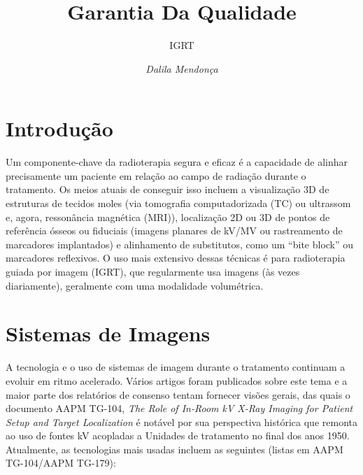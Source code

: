 \documentclass[11pt,a4paper]{article}
\title{\LobsterTwo\Huge{Garantia Da Qualidade}}
\author{\LobsterTwo\Large{IGRT}\nocite{*}}
\date{\LobsterTwo\textit{Dalila Mendonça}}
\begin{document}
	\maketitle

\section{Introdução}

    Um componente-chave da radioterapia segura e eficaz é a capacidade de alinhar precisamente um paciente em relação ao campo de radiação durante o tratamento. Os meios atuais de conseguir isso incluem a visualização 3D de estruturas de tecidos moles (via tomografia computadorizada (TC) ou ultrassom e, agora,  ressonância magnética (MRI)), localização 2D ou 3D de pontos de referência ósseos ou fiduciais (imagens planares de kV/MV ou rastreamento de marcadores implantados) e alinhamento de substitutos, como um ``bite block'' ou marcadores reflexivos. O uso mais extensivo dessas técnicas é para radioterapia guiada por imagem (IGRT), que regularmente usa imagens (às vezes diariamente), geralmente com uma modalidade volumétrica. 

\section{Sistemas de Imagens}

    A tecnologia e o uso de sistemas de imagem durante o tratamento continuam a evoluir em ritmo acelerado. Vários artigos foram publicados sobre este tema e a maior parte dos relatórios de consenso tentam fornecer visões gerais, das quais o documento AAPM TG-104, \textit{The Role of In-Room kV X-Ray Imaging for Patient Setup and Target Localization} é notável por sua perspectiva histórica que remonta ao uso de fontes kV acopladas a Unidades de tratamento  no final dos anos 1950. Atualmente, as tecnologias mais usadas incluem as seguintes (listas em AAPM TG-104/AAPM TG-179):
\end{document}
